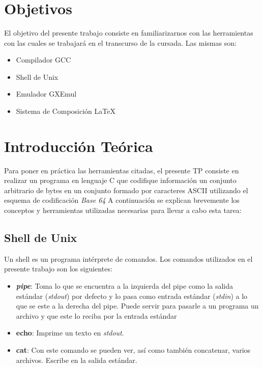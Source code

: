 \documentclass[a4paper,10pt, fleqn]{article}
\title{  }
\begin{document}
\maketitle %
\newpage

\tableofcontents %
\newpage

\section{Objetivos}
	El objetivo del presente trabajo consiste en familiarizarnos con las herramientas con las cuales se trabajará en el transcurso de la cursada. Las mismas son:
	\begin{itemize}
	  \item Compilador GCC
	  \item Shell de Unix
	  \item Emulador GXEmul
	  \item Sistema de Composición \LaTeX{}
	\end{itemize}
	\vspace{1cm}
 
\section{Introducción Teórica}
  \label{sec:InfoTeo}
  Para poner en práctica las herramientas citadas, el presente TP consiste en realizar un programa en lenguaje C que codifique información 
  un conjunto arbitrario de bytes en un conjunto formado por caracteres ASCII utilizando el esquema de codificación \emph{Base 64}
  A continuación se explican brevemente los conceptos y herramientas utilizadas necesarias para llevar a cabo esta tarea:

  \vspace{0.5cm}
	\subsection{Shell de Unix}
	  Un shell es un programa intérprete de comandos. Los comandos utilizados en el presente trabajo
	  son los siguientes:
		\begin{itemize}
		  \item \textbf{\emph{pipe}}: Toma lo que se encuentra a la izquierda del pipe como la salida estándar (\emph{stdout}) por defecto y lo pasa como
		      entrada estándar (\emph{stdin}) a lo que se este a la derecha del pipe. Puede servir para pasarle a un programa un
		      archivo y que este lo reciba por la entrada estándar
		  \item \textbf{echo}: Imprime un texto en \emph{stdout}.
		  \item \textbf{cat}: Con este comando se pueden ver, así como también concatenar, varios archivos. 
		    Escribe en la salida estándar.
		\end{itemize}
		\vspace{0.5cm}
\end{document}
